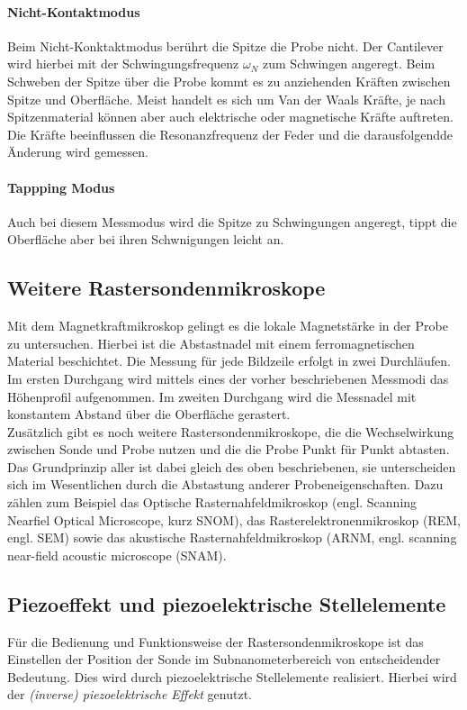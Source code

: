 \documentclass[a4paper,twoside,final]{article}
\begin{document}
\paragraph{Nicht-Kontaktmodus}
Beim Nicht-Konktaktmodus berührt die Spitze die Probe nicht. Der Cantilever wird hierbei mit der Schwingungsfrequenz $\omega_N$ zum Schwingen angeregt. Beim Schweben der Spitze über die Probe kommt es zu anziehenden Kräften zwischen Spitze und Oberfläche. Meist handelt es sich um Van der Waals Kräfte, je nach Spitzenmaterial können aber auch elektrische oder magnetische Kräfte auftreten. Die Kräfte beeinflussen die Resonanzfrequenz der Feder und die darausfolgendde Änderung wird gemessen.

\paragraph{Tappping Modus}
Auch bei diesem Messmodus wird die Spitze zu Schwingungen angeregt, tippt die Oberfläche aber bei ihren Schwnigungen leicht an.

\subsection{Weitere Rastersondenmikroskope}
Mit dem Magnetkraftmikroskop gelingt es die lokale Magnetstärke in der Probe zu untersuchen. Hierbei ist die Abstastnadel mit einem ferromagnetischen Material beschichtet. Die Messung für jede Bildzeile erfolgt in zwei Durchläufen. Im ersten Durchgang wird mittels eines der vorher beschriebenen Messmodi das Höhenprofil aufgenommen. Im zweiten Durchgang wird die Messnadel mit konstantem Abstand über die Oberfläche gerastert.\\

Zusätzlich gibt es noch weitere Rastersondenmikroskope, die die Wechselwirkung zwischen Sonde und Probe nutzen und die die Probe Punkt für Punkt abtasten. Das Grundprinzip aller ist dabei gleich des oben beschriebenen, sie unterscheiden sich im Wesentlichen durch die Abstastung anderer Probeneigenschaften. Dazu zählen zum Beispiel das Optische Rasternahfeldmikroskop (engl. Scanning Nearfiel Optical Microscope, kurz SNOM), das Rasterelektronenmikroskop (REM, engl. SEM) sowie das akustische Rasternahfeldmikroskop (ARNM, engl. scanning near-field acoustic microscope (SNAM).

\subsection{Piezoeffekt und piezoelektrische Stellelemente}
Für die Bedienung und Funktionsweise der Rastersondenmikroskope ist das Einstellen der Position der Sonde im Subnanometerbereich von entscheidender Bedeutung. Dies wird durch piezoelektrische Stellelemente realisiert. Hierbei wird der \textit{(inverse) piezoelektrische Effekt} genutzt.
\end{document}
